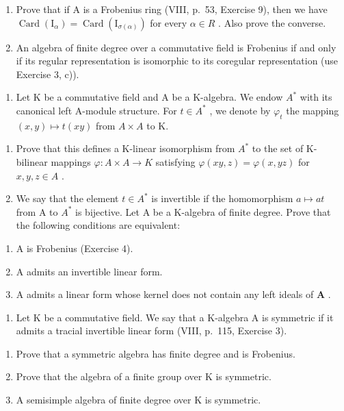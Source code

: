\begin{enumerate}
\def\labelenumi{\alph{enumi})}
\item
  Prove that if A is a Frobenius ring (VIII, p.~53, Exercise 9), then we have \(\operatorname{Card}(\mathrm{I}_{\alpha}) = \operatorname{Card}(\mathrm{I}_{\sigma(\alpha)})\) for every \(\alpha \in R\) . Also prove the converse.
\item
  An algebra of finite degree over a commutative field is Frobenius if and only if its regular representation is isomorphic to its coregular representation (use Exercise 3, c)).
\end{enumerate}

\begin{enumerate}
\def\labelenumi{\arabic{enumi})}
\setcounter{enumi}{4}
\tightlist
\item
  Let K be a commutative field and A be a K-algebra. We endow \(A^{*}\) with its canonical left A-module structure. For \(t \in A^{*}\) , we denote by \(\varphi_{t}\) the mapping \((x, y) \mapsto t(xy)\) from \(A \times A\) to K.
\end{enumerate}

\begin{enumerate}
\def\labelenumi{\alph{enumi})}
\item
  Prove that this defines a K-linear isomorphism from \(A^{*}\) to the set of K-bilinear mappings \(\varphi: A \times A \to K\) satisfying \(\varphi(xy, z) = \varphi(x, yz)\) for \(x, y, z \in A\) .
\item
  We say that the element \(t \in A^{*}\) is invertible if the homomorphism \(a \mapsto at\) from A to \(A^{*}\) is bijective. Let A be a K-algebra of finite degree. Prove that the following conditions are equivalent:
\end{enumerate}

\begin{enumerate}
\def\labelenumi{(\roman{enumi})}
\item
  A is Frobenius (Exercise 4).
\item
  A admits an invertible linear form.
\item
  A admits a linear form whose kernel does not contain any left ideals of \(\mathbf{A}\) .
\end{enumerate}

\begin{enumerate}
\def\labelenumi{\arabic{enumi})}
\setcounter{enumi}{5}
\tightlist
\item
  Let K be a commutative field. We say that a K-algebra A is symmetric if it admits a tracial invertible linear form (VIII, p.~115, Exercise 3).
\end{enumerate}

\begin{enumerate}
\def\labelenumi{\alph{enumi})}
\item
  Prove that a symmetric algebra has finite degree and is Frobenius.
\item
  Prove that the algebra of a finite group over \(\mathrm{K}\) is symmetric.
\item
  A semisimple algebra of finite degree over \(\mathrm{K}\) is symmetric.
\end{enumerate}

